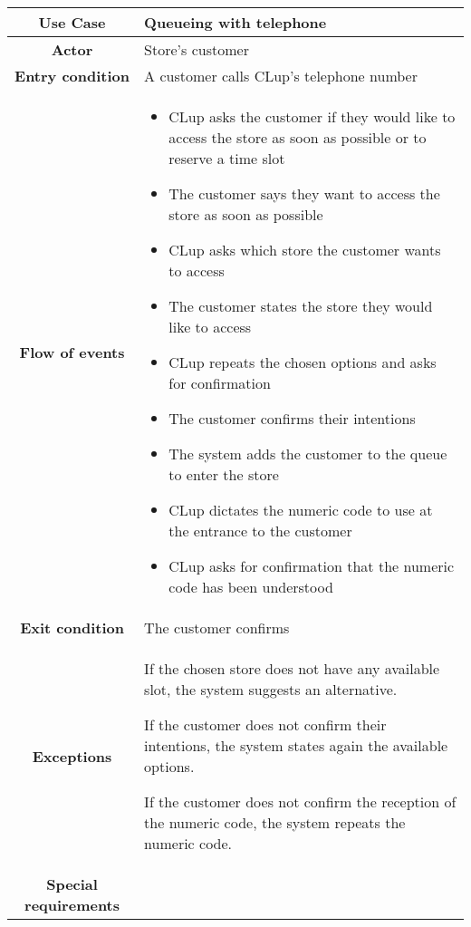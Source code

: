 \documentclass[../../main.tex]{subfiles}
\begin{document}
      \begin{table}[H]
        \centering
          \begin{tabular}{c m{}}
          \hline
          \textbf{Use Case} & Queueing with telephone\\ \hline
          \textbf{Actor} & Store's customer\\ \hline
          \textbf{Entry condition} & A customer calls CLup's telephone number\\  \hline
          \textbf{Flow of events} & \begin{itemize}
                                      \item CLup asks the customer if they would like to access the store as soon as possible or to reserve a time slot
                                      \item The customer says they want to access the store as soon as possible
                                      \item CLup asks which store the customer wants to access
                                      \item The customer states the store they would like to access
                                      \item CLup repeats the chosen options and asks for confirmation
                                      \item The customer confirms their intentions
                                      \item The system adds the customer to the queue to enter the store
                                      \item CLup dictates the numeric code to use at the entrance to the customer
                                      \item CLup asks for confirmation that the numeric code has been understood
                                    \end{itemize}\\ \hline
          \textbf{Exit condition} & The customer confirms \\ \hline
          \textbf{Exceptions} & If the chosen store does not have any available slot, the system suggests an alternative.
          
                                If the customer does not confirm their intentions, the system states again the available options.
                                
                                If the customer does not confirm the reception of the numeric code, the system repeats the numeric code.\\ \hline
          \textbf{Special requirements} &\\ \hline
          \end{tabular}
      \end{table}
\end{document}
